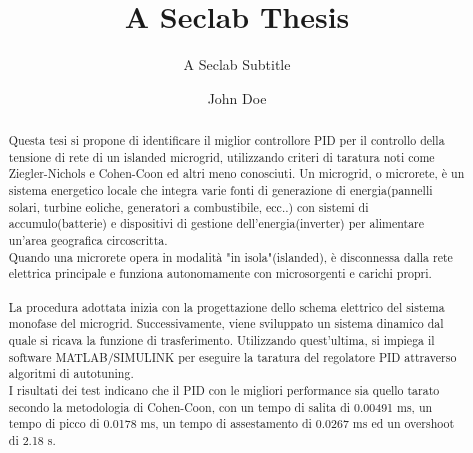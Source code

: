 \documentclass[italian,master]{unibg}
\title{A Seclab Thesis}
\subtitle{A Seclab Subtitle}
\author{John Doe}
\begin{document}
\maketitle
\emptypage

\begin{abstract}
    Questa tesi si propone di identificare il miglior controllore PID per il 
    controllo della tensione di rete di un islanded microgrid, utilizzando
    criteri di taratura noti come Ziegler-Nichols e Cohen-Coon ed altri meno conosciuti.
    Un microgrid, o microrete, è un sistema energetico locale che integra varie
    fonti di generazione di energia(pannelli solari, turbine eoliche,  generatori a combustibile, ecc..) 
    con sistemi di accumulo(batterie) e dispositivi di gestione dell'energia(inverter)
    per alimentare un'area geografica circoscritta.
    \\Quando una microrete opera in modalità "in isola"(islanded), è disconnessa dalla rete elettrica
    principale e funziona autonomamente con microsorgenti e carichi propri.
    \\
    \\La procedura adottata inizia con la progettazione dello schema elettrico
    del sistema monofase del microgrid. Successivamente, viene sviluppato un sistema dinamico
    dal quale si ricava la funzione di trasferimento. Utilizzando quest'ultima, si impiega
    il software MATLAB/SIMULINK per eseguire la taratura del regolatore PID attraverso
    algoritmi di autotuning.
    \\I risultati dei test indicano che il PID con le migliori performance sia quello
    tarato secondo la metodologia di Cohen-Coon, con un tempo di salita di 0.00491 ms, 
    un tempo di picco di 0.0178 ms, un tempo di assestamento di 0.0267 ms ed un overshoot di 2.18 s.

\end{abstract}

\emptypage
\toc
\listoffigures
\listoftables
\emptypage

\clearpage
{}



\nocite{*}
\printbibliography[heading=bibintoc]
\end{document}
